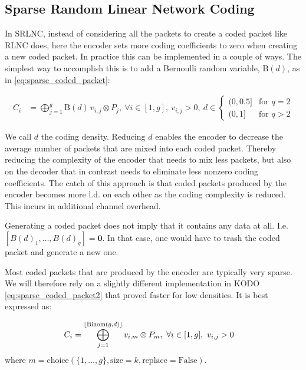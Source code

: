 \subsection{Sparse Random Linear Network Coding}

In \ac{SRLNC}, instead of considering all the packets to create a coded
packet like \ac{RLNC} does, here the encoder sets more coding coefficients to
zero when creating a new coded packet.
In practice this can be implemented in
a couple of ways.
The simplest way to accomplish this is to add a Bernoulli random
variable, $\text{B}(d)$, as in \ref{eq:sparse_coded_packet}:

\begin{align} \label{eq:sparse_coded_packet}
    C_i  &= \bigoplus_{j=1}^{g} \text{B}(d) \, v_{i,j} \otimes P_j ,\ \forall i \in [1,g] ,\
    v_{i,j} > 0,\
    d \in
    \begin{cases}
        {(0,0.5]} & \text{for } q=2 \\
        {(0,1]} & \text{for } q>2
    \end{cases}
\end{align}

We call $d$ the coding density.
Reducing $d$ enables the encoder to decrease the average number of packets that
are mixed into each coded packet. Thereby reducing the complexity of the
encoder that needs to mix less packets, but also on the decoder that in
contrast needs to eliminate less nonzero coding coefficients. The catch of this
approach is that coded packets produced by the encoder becomes more \ac{l.d.}
on each other as the coding complexity is reduced. This incurs in additional
channel overhead.

Generating a coded packet does not imply that it contains any data at all. I.e.
$ \left[ B(d)_{1}, \ldots, B(d)_{g} \right] = \mathbf{0}$.
In that case, one would have to trash the coded packet and generate a new one.

Most coded packets that are produced by the encoder are typically very sparse.
We will therefore rely on a slightly different implementation in KODO
\ref{eq:sparse_coded_packet2} that proved faster for low densities. It is best
expressed as:

\begin{align} \label{eq:sparse_coded_packet2}
    C_i  &= \bigoplus_{j=1}^{\lfloor\text{Binom}(g,d)\rfloor} v_{i,m} \otimes P_{m} ,\
    \forall i \in [1,g] ,\
    v_{i,j} > 0
\end{align}
where
$m = \text{choice}(\{1,\dots,g\}, \text{size}=k, \text{replace}=\text{False})$.


